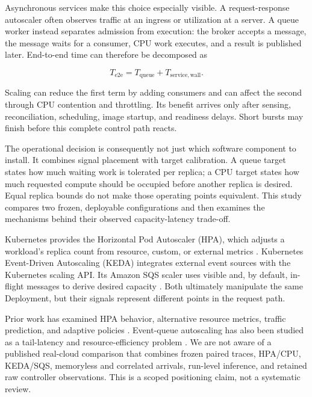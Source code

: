 \documentclass[conference]{IEEEtran}
\begin{document}
Asynchronous services make this choice especially visible. A request-response
autoscaler often observes traffic at an ingress or utilization at a server. A
queue worker instead separates admission from execution: the broker accepts a
message, the message waits for a consumer, CPU work executes, and a result is
published later. End-to-end time can therefore be decomposed as

\begin{equation}
  T_{\mathrm{e2e}} = T_{\mathrm{queue}} + T_{\mathrm{service,wall}}.
\end{equation}

Scaling can reduce the first term by adding consumers and can affect the second
through CPU contention and throttling. Its benefit arrives only after sensing,
reconciliation, scheduling, image startup, and readiness delays. Short bursts
may finish before this complete control path reacts.

The operational decision is consequently not just which software component to
install. It combines signal placement with target calibration. A queue target
states how much waiting work is tolerated per replica; a CPU target states how
much requested compute should be occupied before another replica is desired.
Equal replica bounds do not make those operating points equivalent. This study
compares two frozen, deployable configurations and then examines the mechanisms
behind their observed capacity-latency trade-off.

Kubernetes provides the Horizontal Pod Autoscaler (HPA), which adjusts a
workload's replica count from resource, custom, or external metrics
\cite{KubernetesHPA}. Kubernetes Event-Driven Autoscaling (KEDA) integrates
external event sources with the Kubernetes scaling API. Its Amazon SQS scaler
uses visible and, by default, in-flight messages to derive desired capacity
\cite{KEDASQS}. Both ultimately manipulate the same Deployment, but their
signals represent different points in the request path.

Prior work has examined HPA behavior, alternative resource metrics, traffic
prediction, and adaptive policies \cite{Nguyen2020HPA,Phuc2022TrafficAware,
Toka2020Adaptive,Balla2020Adaptive,Casalicchio2017Metrics}. Event-queue
autoscaling has also been studied as a tail-latency and resource-efficiency
problem \cite{Ezzeddine2024EventQueues}. We are not aware of a published
real-cloud comparison that combines frozen paired traces, HPA/CPU, KEDA/SQS,
memoryless and correlated arrivals, run-level inference, and retained raw
controller observations. This is a scoped positioning claim, not a systematic
review.
\end{document}
